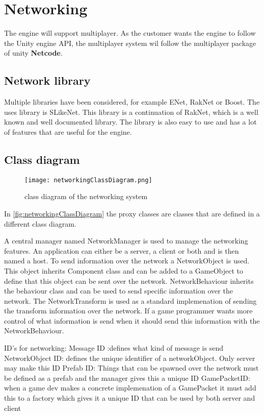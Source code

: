 \section{Networking}
\label{sec:networking}
The engine will support multiplayer.
As the customer wants the engine to follow the Unity engine API, the multiplayer system wil follow the multiplayer package of unity \textbf{Netcode}.

\subsection{Network library}
Multiple libraries have been considered, for example ENet, RakNet or Boost.
The uses library is SLikeNet. This library is a continuation of RakNet, which is a well known and well documented library.
The library is also easy to use and has a lot of features that are useful for the engine.

\subsection{Class diagram}

\begin{figure}[H]
    \centering
    \texttt{[image: networkingClassDiagram.png]}
    \caption{class diagram of the networking system}
    \label{fig:networkingClassDiagram}
\end{figure}
In \autoref{fig:networkingClassDiagram} the proxy classes are classes that are defined in a different class diagram.

A central manager named NetworkManager is used to manage the networking features.
An application can either be a server, a client or both and is then named a host.
To send information over the network a NetworkObject is used.
This object inherits Component class and can be added to a GameObject to define that this object can be sent over the network.
NetworkBehaviour inherits the behaviour class and can be used to send specific information over the network.
The NetworkTransform is used as a standard implemenation of sending the transform information over the network.
If a game programmer wants more control of what information is send when it should send this information with the NetworkBehaviour.

ID's for networking:
Message ID :defines what kind of message is send
NetworkObject ID: defines the unique identifier of a networkObject. Only server may make this ID
Prefab ID: Things that can be spawned over the network must be defined as a prefab and the manager gives this a unique ID
GamePacketID: when a game dev makes a concrete implemenation of a GamePacket it must add this to a factory which gives it a unique ID that can be used by both server and client 


